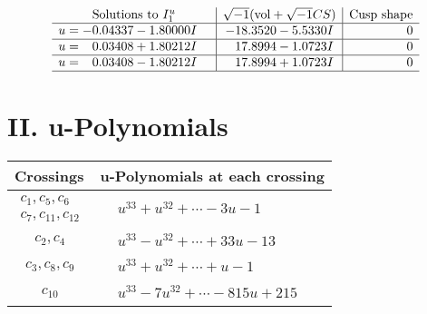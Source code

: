 \documentclass[1p]{elsarticle_modified}
\theoremstyle{definition}
\newcommand{\I}{\sqrt{-1}}
\begin{document}
$$\begin{array}{c|c|c}
\text{Solutions to }I^u_{1}& \I (\text{vol} + \sqrt{-1}CS) & \text{Cusp shape}\\
 \hline 
\begin{aligned}
u &= -0.04337 - 1.80000 I\end{aligned}
 & -18.3520 - 5.5330 I & \phantom{-0.000000 } 0 \\ \hline\begin{aligned}
u &= \phantom{-}0.03408 + 1.80212 I\end{aligned}
 & \phantom{-}17.8994 - 1.0723 I & \phantom{-0.000000 } 0 \\ \hline\begin{aligned}
u &= \phantom{-}0.03408 - 1.80212 I\end{aligned}
 & \phantom{-}17.8994 + 1.0723 I & \phantom{-0.000000 } 0\\
 \hline 
 \end{array}$$\newpage
\newpage\renewcommand{\arraystretch}{1}
\centering \section*{ II. u-Polynomials}
\begin{tabular}{m{50pt}|m{274pt}}
Crossings & \hspace{64pt}u-Polynomials at each crossing \\
\hline $$\begin{aligned}c_{1},c_{5},c_{6}\\c_{7},c_{11},c_{12}\end{aligned}$$&$\begin{aligned}
&u^{33}+u^{32}+\cdots-3 u-1
\end{aligned}$\\
\hline $$\begin{aligned}c_{2},c_{4}\end{aligned}$$&$\begin{aligned}
&u^{33}- u^{32}+\cdots+33 u-13
\end{aligned}$\\
\hline $$\begin{aligned}c_{3},c_{8},c_{9}\end{aligned}$$&$\begin{aligned}
&u^{33}+u^{32}+\cdots+u-1
\end{aligned}$\\
\hline $$\begin{aligned}c_{10}\end{aligned}$$&$\begin{aligned}
&u^{33}-7 u^{32}+\cdots-815 u+215
\end{aligned}$\\
\hline
\end{tabular}\newpage\renewcommand{\arraystretch}{1}
\end{document}
